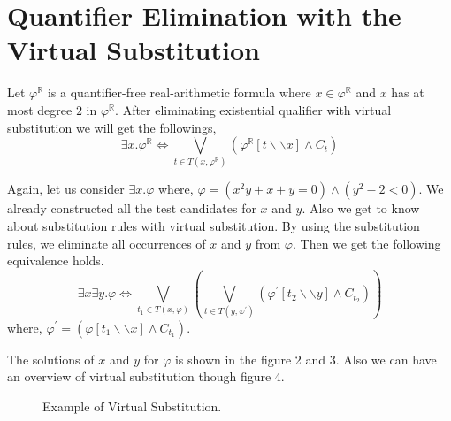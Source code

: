 \section{Quantifier Elimination with the Virtual Substitution}
\label{sec:quantifier-elimination-with-the-virtual-substitution}
Let $\varphi^\mathbb{R}$ is a quantifier-free real-arithmetic formula where $x\in \varphi^\mathbb{R}$ and $x$ has at most degree $2$ in $\varphi^\mathbb{R}$. After eliminating existential qualifier with virtual substitution we will get the followings,
$$ \exists x. \varphi^\mathbb{R} \Longleftrightarrow \bigvee\limits_{t\in T(x,\varphi^\mathbb{R})}  (\varphi^\mathbb{R} [t\backslash\backslash x] \wedge C_t)$$

Again, let us consider $\exists x.\varphi$ where, $\varphi = (x^{2}y + x + y = 0) \wedge (y^{2} -2 < 0)$. We already constructed all the test candidates for $x$ and $y$. Also we get to know about substitution rules with virtual substitution. By using the substitution rules, we eliminate all occurrences of $x$ and $y$ from $\varphi$. Then we get the following equivalence holds.
$$ \exists x\exists y. \varphi \Longleftrightarrow \bigvee\limits_{t_{1}\in T(x,\varphi)}(\bigvee\limits_{t\in T(y,\varphi^{\prime})}  (\varphi^{\prime} [t_{2}\backslash\backslash y] \wedge C_{t_{2}}))$$
where, $\varphi^{\prime} = (\varphi [t_{1}\backslash\backslash x] \wedge C_{t_{1}})$.
\begin{center}
	
\end{center}
The solutions of $x$ and $y$ for $\varphi$ is shown in the figure 2 and 3. Also we can have an overview of virtual substitution though figure 4.

\begin{figure}[htb] %
	\begin{center}
	
	\end{center}
	\caption{Example of Virtual Substitution.}
	\label{fig:graph}
\end{figure}